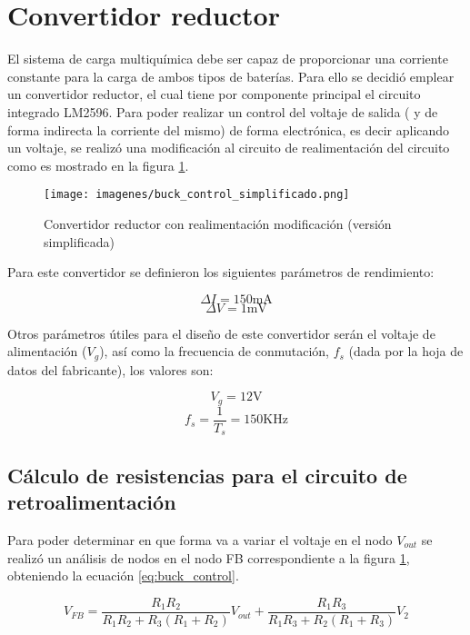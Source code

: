 
\section{Convertidor reductor}
    \label{sec:buck_design}

    El sistema de carga multiquímica debe ser capaz de  proporcionar una 
    corriente constante para la carga de ambos tipos de baterías. Para ello
    se decidió emplear un convertidor reductor, el cual tiene por componente principal
    el circuito integrado LM2596. Para poder realizar un control del voltaje de salida ( y de
    forma indirecta la corriente del mismo)
    de forma electrónica, es decir aplicando un voltaje, se realizó una modificación al circuito
    de realimentación del circuito como es mostrado en la figura \ref{fig:buck_modificado}.

    \begin{figure}[H]
        \centering
        \texttt{[image: imagenes/buck\_control\_simplificado.png]}
        \caption{Convertidor reductor con realimentación modificación (versión simplificada) }
        \label{fig:buck_modificado}
    \end{figure}

    Para este convertidor se definieron los siguientes parámetros de rendimiento:

    $$ \Delta I = 150 \text{mA} $$
    $$ \Delta V = 1 \text{mV}$$

    Otros parámetros útiles para el diseño de este convertidor serán el voltaje
    de alimentación ($V_g$), así como la frecuencia de conmutación, $f_s$ (dada por la hoja 
    de datos del fabricante), los valores son:

    $$V_g = 12\text{V}$$
    $$ f_s = \frac{1}{T_s} = 150 \text{KHz}$$



    \subsection{Cálculo de resistencias para el circuito de retroalimentación}

    \label{sec:res_ret}

    Para poder determinar en que forma va a variar el voltaje en el nodo $V_{out}$ se realizó un 
    análisis de nodos en el nodo FB correspondiente a la figura \ref*{fig:buck_modificado}, 
    obteniendo la ecuación \ref*{eq:buck_control}.

    \begin{equation}
        V_{FB} = \frac{R_1R_2}{R_1R_2+R_3(R_1+R_2)} V_{out} + \frac{R_1R_3}{R_1R_3+R_2(R_1+R_3)} V_2
        \label{eq:buck_control}
    \end{equation}

